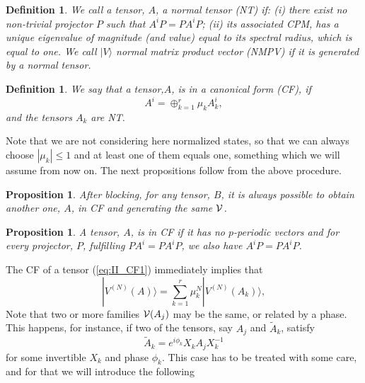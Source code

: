 \documentclass{elsarticle}
\newcommand{\be}{\begin{equation}}
\newcommand{\ee}{\end{equation}}
\newtheorem{prop}[thm]{Proposition}
\newtheorem{defn}[thm]{Definition}
\begin{document}
\begin{defn}
We call a tensor, $A$, a {\em normal tensor} (NT) if: (i) there exist no non-trivial projector $P$ such that $A^iP=PA^iP$; (ii) its associated CPM, has a unique eigenvalue of magnitude (and value) equal to its spectral radius, which is equal to one. We call $|V\rangle$ {\em normal matrix product vector} (NMPV) if it is generated by a normal tensor.
\end{defn}

\begin{defn}
We say that a tensor,$A$, is in a {\em canonical form} (CF), if
 \be
 \label{eq:II_CF1}
 A^i = \oplus_{k=1}^r \mu_k A^i_k,
 \ee
and the tensors  $A_k$ are NT.
\end{defn}

Note that we are not considering here normalized states, so that we can always choose $|\mu_k|\le 1$ and at least one of them equals one, something which we will assume from now on.
The next propositions follow from the above procedure.

\begin{prop}
After blocking, for any tensor, $B$, it is always possible to obtain another one, $A$, in CF and generating the same ${\cal V}$.
\end{prop}

\begin{prop}
A tensor, $A$, is in CF if it has no $p$-periodic vectors and for every projector, $P$, fulfilling $PA^i=PA^iP$, we also have $A^iP=PA^iP$.
\end{prop}


The CF of a tensor (\ref{eq:II_CF1}) immediately implies that
 \be
 \label{eq:II_Psi_k}
 |V^{(N)}(A)\rangle = \sum_{k=1}^r \mu_k^N|V^{(N)}(A_k)\rangle,
 \ee
Note that two or more families ${\cal V}(A_j)$ may be the same, or related by a phase. This happens, for instance, if two of the tensors, say $A_j$ and $\tilde A_k$, satisfy
 \be
 \label{eq:II:A=XAX}
 \tilde A_k = e^{i\phi_k} X_k A_j X_k^{-1}
 \ee
for some invertible $X_k$ and phase $\phi_k$. This case has to be treated with some care, and for that we will introduce the following
\end{document}
